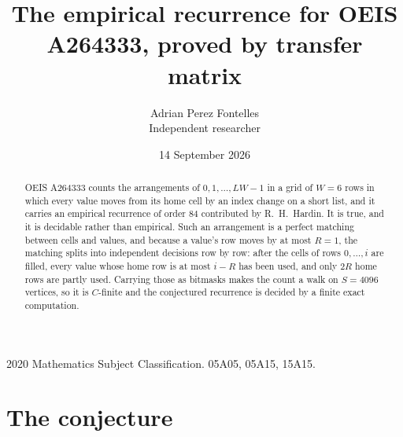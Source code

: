 \documentclass[11pt,a4paper]{article}
\title{The empirical recurrence for OEIS A264333, proved by transfer matrix}
\author{Adrian Perez Fontelles\\ \small Independent researcher}
\date{14 September 2026}
\theoremstyle{plain}
\theoremstyle{definition}
\begin{document}
\maketitle

\begin{abstract}
OEIS A264333 counts the arrangements of $0,1,\dots,LW-1$ in a grid of $W=6$ rows in which
every value moves from its home cell by an index change on a short list, and it carries an
empirical recurrence of order $84$ contributed by R.~H.~Hardin. It is true, and it is
decidable rather than empirical. Such an arrangement is a perfect matching between cells and
values, and because a value's row moves by at most $R=1$, the matching splits into
independent decisions row by row: after the cells of rows $0,\dots,i$ are filled,
every value whose home row is at most $i-R$ has been used, and only $2R$ home rows are
partly used. Carrying those as bitmasks makes the count a walk on $S=4096$ vertices, so it is
$C$-finite and the conjectured recurrence is decided by a finite exact computation.
\end{abstract}

\noindent\small 2020 Mathematics Subject Classification. 05A05, 05A15, 15A15.\normalsize

\section{The conjecture}
\end{document}
